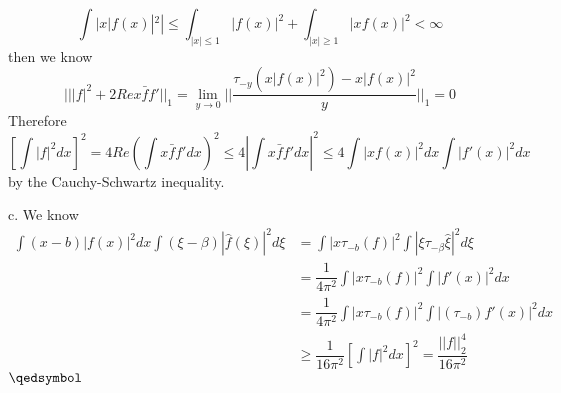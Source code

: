 \documentclass[lang=en,11pt,a4paper,citestyle =authoryear]{elegantpaper}
\newcommand{\prvd}{$\hfill \qedsymbol$}
\begin{document}
\[
\int |x|f(x)|^2| \leq \int_{|x|\leq 1} |f(x)|^2 + \int_{|x|\geq 1}|xf(x)|^2  < \infty
\]
then we know
\[
|||f|^2+2Rex\bar{f}f'||_1 = \lim_{y\to 0}||\dfrac{\tau_{-y}(x|f(x)|^2)-x|f(x)|^2}{y}||_1 = 0
\]
Therefore
\[
[\int |f|^2 dx]^2 = 4Re(\int x\bar{f}f' dx)^2 \leq 4|\int x\bar{f}f' dx|^2 \leq 4 \int |xf(x)|^2 dx \int |f'(x)|^2 dx
\]
by the Cauchy-Schwartz inequality.\par
c. We know
\[
\begin{aligned}
\int (x-b)|f(x)|^2 dx\int(\xi-\beta)|\hat{f}(\xi)|^2 d\xi&= \int |x\tau_{-b}(f)|^2\int |\xi\tau_{-\beta}\hat{\xi}|^2 d\xi \\
&= \dfrac{1}{4\pi^2}\int |x\tau_{-b}(f)|^2\int  |f'(x)|^2dx\\
&= \dfrac{1}{4\pi^2}\int |x\tau_{-b}(f)|^2\int  |(\tau_{-b})f'(x)|^2dx\\
&\geq \dfrac{1}{16\pi^2} [\int |f|^2 dx]^2 = \dfrac{||f||_2^4}{16\pi^2}
\end{aligned}
\]
\prvd
\vspace{0.5em}
\end{document}
